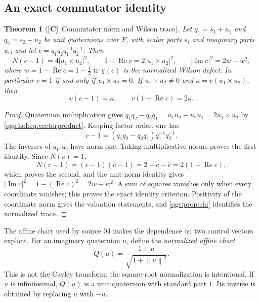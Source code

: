 \documentclass[11pt,oneside]{article}
\numberwithin{equation}{section}
\theoremstyle{plain}
\newtheorem{theorem}{Theorem}[section]
\theoremstyle{definition}
\theoremstyle{remark}
\DeclareMathOperator{\tr}{tr}
\DeclareMathOperator{\Rea}{Re}
\DeclareMathOperator{\Ima}{Im}
\newcommand{\abs}[1]{\left|#1\right|}
\newcommand{\norm}[1]{\left\|#1\right\|}
\newcommand{\TC}{\textcolor{TierC}{\textsf{\bfseries[C]}}}
\begin{document}
\subsection{An exact commutator identity}\label{qgs:sec:commutator}
\begin{theorem}[\TC\ Commutator norm and Wilson trace]\label{qgs:ops:thm:commutator}
Let $q_1=s_1+u_1$ and $q_2=s_2+u_2$ be unit quaternions over $F$, with scalar parts $s_i$ and imaginary parts $u_i$, and let $c=q_1q_2q_1^{-1}q_2^{-1}$. Then
\begin{equation}\label{qgs:ops:eq:commutator-identity}
 N(c-1)=4\abs{u_1\times u_2}^2,
 \qquad 1-\Rea c=2\abs{u_1\times u_2}^2,
 \qquad \abs{\Ima c}^2=2w-w^2,
\end{equation}
where $w=1-\Rea c=1-\tfrac12\tr\chi(c)$ is the normalized Wilson defect. In particular $c=1$ if and only if $u_1\times u_2=0$. If $u_1\times u_2\ne0$ and $\kappa=v(u_1\times u_2)$, then
\begin{equation}\label{qgs:ops:eq:loop-valuations}
 v(c-1)=\kappa,\qquad v(1-\Rea c)=2\kappa.
\end{equation}
\end{theorem}
\begin{proof}
Quaternion multiplication gives $q_1q_2-q_2q_1=u_1u_2-u_2u_1=2u_1\times u_2$ by \eqref{qgs:hol:eq:vectorproduct}. Keeping factor order, one has
\[
 c-1=(q_1q_2-q_2q_1)q_1^{-1}q_2^{-1}.
\]
The inverses of $q_1,q_2$ have norm one. Taking multiplicative norms proves the first identity. Since $N(c)=1$,
\[
 N(c-1)=(c-1)(\overline c-1)=2-c-\overline c=2(1-\Rea c),
\]
which proves the second, and the unit-norm identity gives $\abs{\Ima c}^2=1-(\Rea c)^2=2w-w^2$. A sum of squares vanishes only when every coordinate vanishes; this proves the exact identity criterion. Positivity of the coordinate norm gives the valuation statements, and \cref{qgs:prop:chi} identifies the normalized trace.
\end{proof}

The affine chart used by source 04 makes the dependence on two control vectors explicit. For an imaginary quaternion $u$, define the \emph{normalized affine chart}
\begin{equation}\label{qgs:hol:eq:Q}
 Q(u)=\frac{1+u}{\sqrt{1+\norm u^2}}.
\end{equation}
This is not the Cayley transform: the square-root normalization is intentional. If $u$ is infinitesimal, $Q(u)$ is a unit quaternion with standard part $1$. Its inverse is obtained by replacing $u$ with $-u$.
\end{document}
